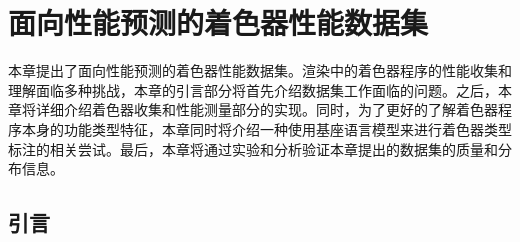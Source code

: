 
\chapter{面向性能预测的着色器性能数据集}

{\added 本章提出了面向性能预测的着色器性能数据集。渲染中的着色器程序的性能收集和理解面临多种挑战，本章的引言部分将首先介绍数据集工作面临的问题。之后，本章将详细介绍着色器收集和性能测量部分的实现。同时，为了更好的了解着色器程序本身的功能类型特征，本章同时将介绍一种使用基座语言模型来进行着色器类型标注的相关尝试。最后，本章将通过实验和分析验证本章提出的数据集的质量和分布信息。}

\section{引言}

